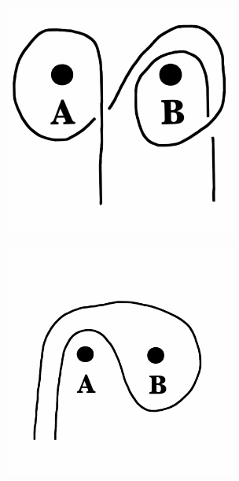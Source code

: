 \documentclass[12pt,letterpaper]{article}
\theoremstyle{definition}
\begin{document}
\begin{figure}[h]
    \includegraphics[height=3in]{meeting02pics/AsBB.png}
\end{figure}

\begin{figure}[h]
    \includegraphics[height=3in]{meeting02pics/ABAs.png}
\end{figure}
\end{document}
